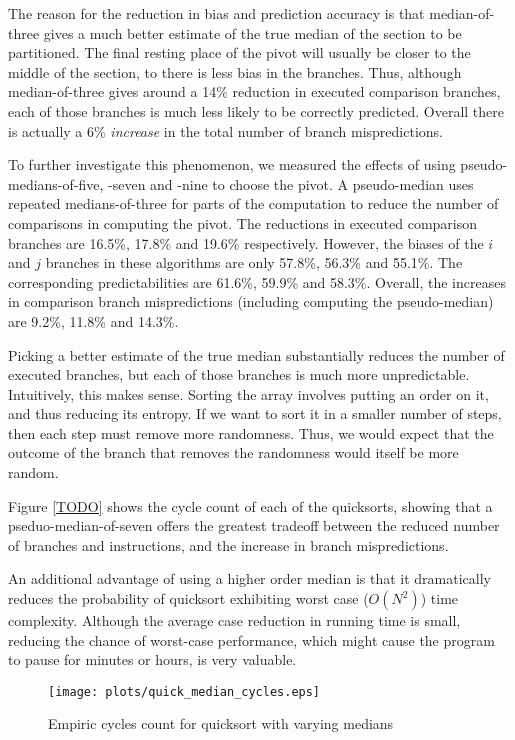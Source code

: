 The reason for the reduction in bias and prediction accuracy is that
median-of-three gives a much better estimate of the true median of the
section to be partitioned. The final resting place of the pivot will
usually be closer to the middle of the section, to there is less bias
in the branches. Thus, although median-of-three gives around a 14\%
reduction in executed comparison branches, each of those branches is
much less likely to be correctly predicted. Overall there is actually
a 6\% \textit{increase} in the total number of branch mispredictions.

To further investigate this phenomenon, we measured the effects of
using pseudo-medians-of-five, -seven and -nine to choose the pivot. A
pseudo-median uses repeated medians-of-three for parts of the
computation to reduce the number of comparisons in computing the
pivot. The reductions in executed comparison branches are 16.5\%,
17.8\% and 19.6\% respectively. However, the biases of the $i$ and $j$
branches in these algorithms are only 57.8\%, 56.3\% and 55.1\%. The
corresponding predictabilities are 61.6\%, 59.9\% and 58.3\%. Overall,
the increases in comparison branch mispredictions (including computing
the pseudo-median) are 9.2\%, 11.8\% and 14.3\%. 

Picking a better estimate of the true median substantially reduces the
number of executed branches, but each of those branches is much more
unpredictable. Intuitively, this makes sense. Sorting the array
involves putting an order on it, and thus reducing its entropy. If we
want to sort it in a smaller number of steps, then each step must
remove more randomness. Thus, we would expect that the outcome of the
branch that removes the randomness would itself be more random.

Figure \ref{TODO} shows the cycle count of each of the quicksorts,
showing that a pseduo-median-of-seven offers the greatest tradeoff
between the reduced number of branches and instructions, and the
increase in branch mispredictions.

An additional advantage of using a higher order median is that it
dramatically reduces the probability of quicksort exhibiting worst
case ($O(N^2)$) time complexity. Although the average case reduction
in running time is small, reducing the chance of worst-case
performance, which might cause the program to pause for minutes or
hours, is very valuable.

\begin{figure}
\texttt{[image: plots/quick\_median\_cycles.eps]}
\caption{Empiric cycles count for quicksort with varying medians}
\label{quick_median_cycles}
\end{figure}


